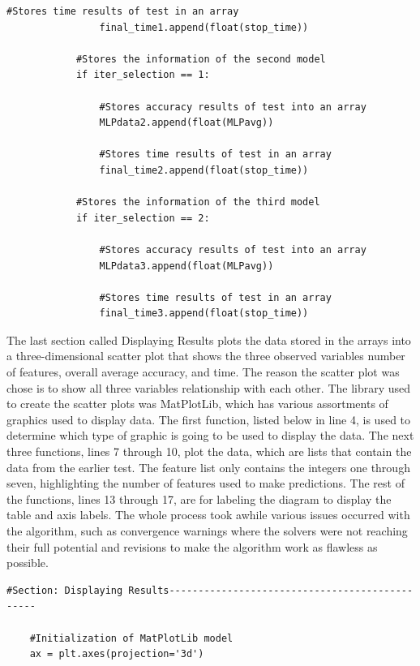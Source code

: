 \documentclass[a4paper, 12pt]{article}
\begin{document}
\begin{paragraph}
\begin{lstlisting}[frame = single]
                #Stores time results of test in an array
                final_time1.append(float(stop_time))

            #Stores the information of the second model
            if iter_selection == 1:

                #Stores accuracy results of test into an array
                MLPdata2.append(float(MLPavg))

                #Stores time results of test in an array
                final_time2.append(float(stop_time))

            #Stores the information of the third model
            if iter_selection == 2:

                #Stores accuracy results of test into an array
                MLPdata3.append(float(MLPavg))

                #Stores time results of test in an array
                final_time3.append(float(stop_time))
\end{lstlisting}

\par

\indent The last section called Displaying Results plots the data stored in the arrays into a three-dimensional scatter plot that shows the three observed variables number of features, overall average accuracy, and time. The reason the scatter plot was chose is to show all three variables relationship with each other. The library used to create the scatter plots was MatPlotLib, which has various assortments of graphics used to display data. The first function, listed below in line 4, is used to determine which type of graphic is going to be used to display the data. The next three functions, lines 7 through 10, plot the data, which are lists that contain the data from the earlier test. The feature list only contains the integers one through seven, highlighting the number of features used to make predictions. The rest of the functions, lines 13 through 17, are for labeling the diagram to display the table and axis labels. The whole process took awhile various issues occurred with the algorithm, such as convergence warnings where the solvers were not reaching their full potential and revisions to make the algorithm work as flawless as possible.
\newline
\begin{lstlisting}[frame = single]
    #Section: Displaying Results-----------------------------------------------

    #Initialization of MatPlotLib model
    ax = plt.axes(projection='3d')


\end{lstlisting}
\end{paragraph}
\end{document}
